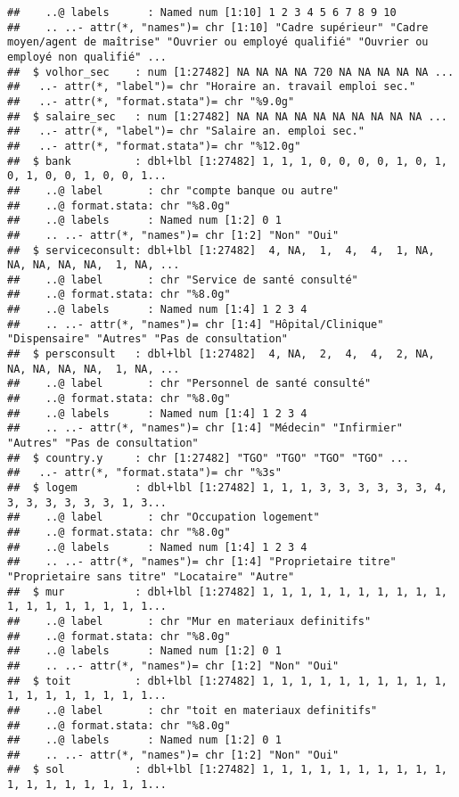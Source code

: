 \documentclass[
]{article}
\begin{document}
\begin{verbatim}
##    ..@ labels      : Named num [1:10] 1 2 3 4 5 6 7 8 9 10
##    .. ..- attr(*, "names")= chr [1:10] "Cadre supérieur" "Cadre moyen/agent de maîtrise" "Ouvrier ou employé qualifié" "Ouvrier ou employé non qualifié" ...
##  $ volhor_sec    : num [1:27482] NA NA NA NA 720 NA NA NA NA NA ...
##   ..- attr(*, "label")= chr "Horaire an. travail emploi sec."
##   ..- attr(*, "format.stata")= chr "%9.0g"
##  $ salaire_sec   : num [1:27482] NA NA NA NA NA NA NA NA NA NA ...
##   ..- attr(*, "label")= chr "Salaire an. emploi sec."
##   ..- attr(*, "format.stata")= chr "%12.0g"
##  $ bank          : dbl+lbl [1:27482] 1, 1, 1, 0, 0, 0, 0, 1, 0, 1, 0, 1, 0, 0, 1, 0, 0, 1...
##    ..@ label       : chr "compte banque ou autre"
##    ..@ format.stata: chr "%8.0g"
##    ..@ labels      : Named num [1:2] 0 1
##    .. ..- attr(*, "names")= chr [1:2] "Non" "Oui"
##  $ serviceconsult: dbl+lbl [1:27482]  4, NA,  1,  4,  4,  1, NA, NA, NA, NA, NA,  1, NA, ...
##    ..@ label       : chr "Service de santé consulté"
##    ..@ format.stata: chr "%8.0g"
##    ..@ labels      : Named num [1:4] 1 2 3 4
##    .. ..- attr(*, "names")= chr [1:4] "Hôpital/Clinique" "Dispensaire" "Autres" "Pas de consultation"
##  $ persconsult   : dbl+lbl [1:27482]  4, NA,  2,  4,  4,  2, NA, NA, NA, NA, NA,  1, NA, ...
##    ..@ label       : chr "Personnel de santé consulté"
##    ..@ format.stata: chr "%8.0g"
##    ..@ labels      : Named num [1:4] 1 2 3 4
##    .. ..- attr(*, "names")= chr [1:4] "Médecin" "Infirmier" "Autres" "Pas de consultation"
##  $ country.y     : chr [1:27482] "TGO" "TGO" "TGO" "TGO" ...
##   ..- attr(*, "format.stata")= chr "%3s"
##  $ logem         : dbl+lbl [1:27482] 1, 1, 1, 3, 3, 3, 3, 3, 3, 4, 3, 3, 3, 3, 3, 3, 1, 3...
##    ..@ label       : chr "Occupation logement"
##    ..@ format.stata: chr "%8.0g"
##    ..@ labels      : Named num [1:4] 1 2 3 4
##    .. ..- attr(*, "names")= chr [1:4] "Proprietaire titre" "Proprietaire sans titre" "Locataire" "Autre"
##  $ mur           : dbl+lbl [1:27482] 1, 1, 1, 1, 1, 1, 1, 1, 1, 1, 1, 1, 1, 1, 1, 1, 1, 1...
##    ..@ label       : chr "Mur en materiaux definitifs"
##    ..@ format.stata: chr "%8.0g"
##    ..@ labels      : Named num [1:2] 0 1
##    .. ..- attr(*, "names")= chr [1:2] "Non" "Oui"
##  $ toit          : dbl+lbl [1:27482] 1, 1, 1, 1, 1, 1, 1, 1, 1, 1, 1, 1, 1, 1, 1, 1, 1, 1...
##    ..@ label       : chr "toit en materiaux definitifs"
##    ..@ format.stata: chr "%8.0g"
##    ..@ labels      : Named num [1:2] 0 1
##    .. ..- attr(*, "names")= chr [1:2] "Non" "Oui"
##  $ sol           : dbl+lbl [1:27482] 1, 1, 1, 1, 1, 1, 1, 1, 1, 1, 1, 1, 1, 1, 1, 1, 1, 1...

\end{verbatim}
\end{document}
